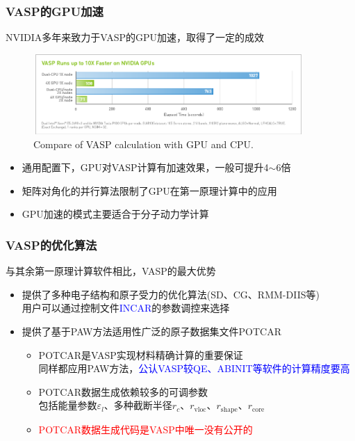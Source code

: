\frame
{
	\frametitle{\textrm{VASP}的\textrm{GPU}加速}
\textrm{NVIDIA}多年来致力于\textrm{VASP}的\textrm{GPU}加速，取得了一定的成效
\begin{figure}[h!]
	\vspace{-0.15in}
\centering
\includegraphics[height=1.2in,width=4.05in,viewport=0 0 850 260,clip]{Figures/VASP-GPU-CPU.png}
\caption{\tiny \textrm{Compare of VASP calculation with GPU and CPU.}}%
\label{VASP_GPU}
\end{figure} 
\begin{itemize}
	\item 通用配置下，\textrm{GPU}对\textrm{VASP}计算有加速效果，一般可提升4$\sim$6倍
	\item 矩阵对角化的并行算法限制了\textrm{GPU}在第一原理计算中的应用
	\item \textrm{GPU}加速的模式主要适合于分子动力学计算
\end{itemize}
}

\frame
{
	\frametitle{\textrm{VASP}的优化算法}
	与其余第一原理计算软件相比，\textrm{VASP}的最大优势
	\begin{itemize}
		\item 提供了多种电子结构和原子受力的优化算法(\textrm{SD}、\textrm{CG}、\textrm{RMM-DIIS}等)\\
			用户可以通过控制文件\textcolor{blue}{\textrm{INCAR}}的参数调控来选择
		\item 提供了基于\textrm{PAW}方法适用性广泛的原子数据集文件\textrm{POTCAR}
	\begin{itemize}
		\item \textrm{POTCAR}是\textrm{VASP}实现材料精确计算的重要保证\\
			同样都应用\textrm{PAW}方法，\textcolor{blue}{公认\textrm{VASP}较\textrm{QE}、\textrm{ABINIT}等软件的计算精度要高}
		\item \textrm{POTCAR}数据生成依赖较多的可调参数\\
			包括能量参数$\varepsilon_l$、多种截断半径$r_c$、$r_{\mathrm{vloc}}$、$r_{\mathrm{shape}}$、$r_{\mathrm{core}}$
		\item \textcolor{red}{\textrm{POTCAR}数据生成代码是\textrm{VASP}中唯一没有公开的}
	\end{itemize}
	\end{itemize}
}


